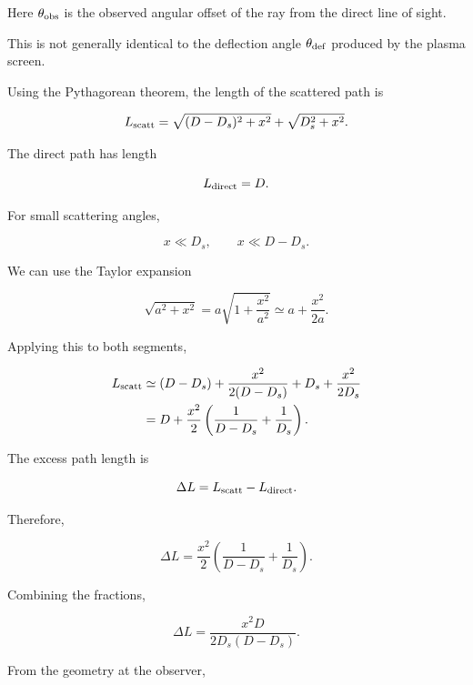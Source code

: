 Here $\theta_{\rm obs}$ is the observed
angular offset of the ray from the direct
line of sight.

This is not generally identical to the
deflection angle $\theta_{\rm def}$
produced by the plasma screen.

Using the Pythagorean theorem, the length
of the scattered path is

\begin{equation}
L_{\rm scatt}
=
\sqrt{(D-D_s)^2+x^2}
+
\sqrt{D_s^2+x^2}.
\end{equation}

The direct path has length

\begin{equation}
L_{\rm direct}=D.
\end{equation}

For small scattering angles,

\begin{equation}
x\ll D_s,
\qquad
x\ll D-D_s.
\end{equation}

We can use the Taylor expansion

\begin{equation}
\sqrt{a^2+x^2}
=
a\sqrt{1+\frac{x^2}{a^2}}
\simeq
a+\frac{x^2}{2a}.
\end{equation}

Applying this to both segments,

\begin{align}
L_{\rm scatt}
&\simeq
(D-D_s)
+\frac{x^2}{2(D-D_s)}
+D_s
+\frac{x^2}{2D_s}\\
&=
D+\frac{x^2}{2}
\left(
\frac{1}{D-D_s}
+\frac{1}{D_s}
\right).
\end{align}

The excess path length is

\begin{equation}
\Delta L=L_{\rm scatt}-L_{\rm direct}.
\end{equation}

Therefore,

\begin{equation}
\Delta L=
\frac{x^2}{2}
\left(
\frac{1}{D-D_s}
+\frac{1}{D_s}
\right).
\end{equation}

Combining the fractions,

\begin{equation}
\boxed{
\Delta L=
\frac{x^2D}{2D_s(D-D_s)}.
}
\end{equation}

From the geometry at the observer,

